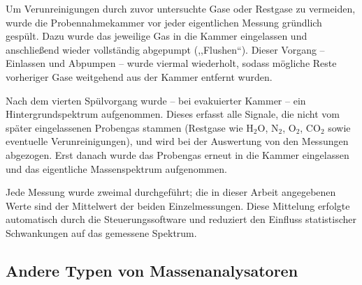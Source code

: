 \documentclass{article}
\begin{document}
Um Verunreinigungen durch zuvor untersuchte Gase oder Restgase zu
vermeiden, wurde die Probennahmekammer vor jeder eigentlichen Messung
gründlich gespült. Dazu wurde das jeweilige Gas in die Kammer
eingelassen und anschließend wieder vollständig abgepumpt
(,,Flushen``). Dieser Vorgang -- Einlassen und Abpumpen -- wurde
viermal wiederholt, sodass mögliche Reste vorheriger Gase weitgehend
aus der Kammer entfernt wurden.

Nach dem vierten Spülvorgang wurde -- bei evakuierter Kammer -- ein
Hintergrundspektrum aufgenommen. Dieses erfasst alle Signale, die
nicht vom später eingelassenen Probengas stammen (Restgase wie H$_2$O,
N$_2$, O$_2$, CO$_2$ sowie eventuelle Verunreinigungen), und wird bei
der Auswertung von den Messungen abgezogen. Erst danach wurde das
Probengas erneut in die Kammer eingelassen und das eigentliche
Massenspektrum aufgenommen.

Jede Messung wurde zweimal durchgeführt; die in dieser Arbeit
angegebenen Werte sind der Mittelwert der beiden Einzelmessungen. Diese
Mittelung erfolgte automatisch durch die Steuerungssoftware und
reduziert den Einfluss statistischer Schwankungen auf das gemessene
Spektrum.

\subsection{Andere Typen von Massenanalysatoren}
\end{document}

